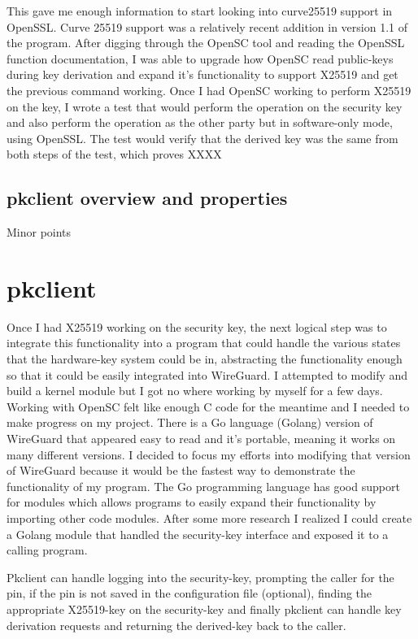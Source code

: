 \documentclass [11pt, proquest] {uwthesis}[2020/02/24]
\begin{document}
This gave me enough information to start looking into curve25519 support in OpenSSL. Curve 25519 support was a relatively recent addition in version 1.1 of the program\cite{noauthor_support_nodate}.
After digging through the OpenSC tool and reading the OpenSSL function documentation, I was able to upgrade how OpenSC read public-keys during key derivation and expand it's functionality to support X25519 and get the previous command working.
Once I had OpenSC working to perform X25519 on the key, I wrote a test that would perform the operation on the security key and also perform the operation as the other party but in software-only mode, using OpenSSL. The test would verify that the derived key was the same from both steps of the test, which proves XXXX
\subsection {pkclient overview and properties}
Minor points

\section{pkclient}
Once I had X25519 working on the security key, the next logical step was to integrate this functionality into a program that could handle the various states that the hardware-key system could be in, abstracting the functionality enough so that it could be easily integrated into WireGuard. I attempted to modify and build a kernel module but I got no where working by myself for a few days. Working with OpenSC felt like enough C code for the meantime and I needed to make progress on my project. There is a Go language (Golang) version of WireGuard that appeared easy to read and it's portable, meaning it works on many different versions. I decided to focus my efforts into modifying that version of WireGuard because it would be the fastest way to demonstrate the functionality of my program.
The Go programming language has good support for modules which allows programs to easily expand their functionality by importing other code modules. After some more research I realized I could create a Golang module that handled the security-key interface and exposed it to a calling program. 

Pkclient can handle logging into the security-key, prompting the caller for the pin, if the pin is not saved in the configuration file (optional), finding the appropriate X25519-key on the security-key and finally pkclient can handle key derivation requests and returning the derived-key back to the caller.
\end{document}
